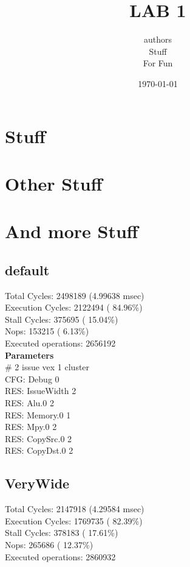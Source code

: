 \documentclass{article}
\begin{document}
\author{authors\\
  Stuff\\
  For Fun}
\date{\today}
\title{LAB 1}
\maketitle


\section{Stuff}

\section{Other Stuff}

\section{And more Stuff}

\subsection{default}
Total Cycles:                           2498189 (4.99638 msec)\\
Execution Cycles:                         2122494 ( 84.96\%)\\
Stall Cycles:                              375695 ( 15.04\%)\\
Nops:                                      153215 (  6.13\%)\\
Executed operations:                      2656192\\

\textbf{Parameters}\\
\# 2 issue vex 1 cluster \\
CFG: Debug 0\\
RES: IssueWidth 2\\
RES: Alu.0 2 \\
RES: Memory.0 1 \\ 
RES: Mpy.0 2  \\
RES: CopySrc.0 2 \\ 
RES: CopyDst.0 2 \\

\subsection{VeryWide}

Total Cycles:                             2147918 (4.29584 msec)\\
Execution Cycles:                         1769735 ( 82.39\%)\\
Stall Cycles:                              378183 ( 17.61\%)\\
Nops:                                      265686 ( 12.37\%)\\
Executed operations:                      2860932\\
\end{document}
